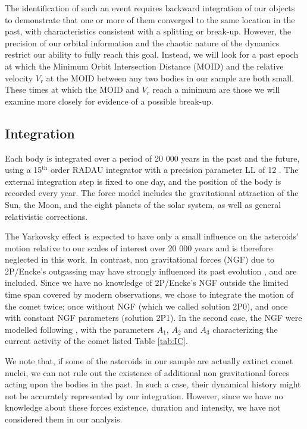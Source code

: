 \documentclass[letters,a4paper,fleqn,usenatbib]{mnras}
\begin{document}
The identification of such an event requires backward integration of our objects to demonstrate that one or more of them converged to the same location in the past, with characteristics consistent with a splitting or break-up. However, the precision of our orbital information and the chaotic nature of the dynamics restrict our ability to fully reach this goal. Instead, we will look for a past epoch at which the Minimum Orbit Intersection Distance (MOID) and the relative velocity $V_r$ at the MOID between any two bodies in our sample are both small. These times at which the MOID and $V_r$ reach a minimum are those we will examine more closely for evidence of a possible break-up.

\subsection{Integration}\label{sec:integration}

Each body is integrated over a period of 20 000 years in the past and the future, using a 15$^\text{th}$ order RADAU integrator with a precision parameter LL of 12 \citep{Everhart1985}. The external integration step is fixed to one day, and the position of the body is recorded every year. The force model includes the gravitational attraction of the Sun, the Moon, and the eight planets of the solar system, as well as general relativistic corrections. 

The Yarkovsky effect is expected to have only a small influence on the asteroids' motion relative to our scales of interest over 20 000 years \citep{Bottke2006a} and is therefore neglected in this work. In contrast, non gravitational forces (NGF) due to 2P/Encke's outgassing may have strongly influenced its past evolution \citep[e.g.,][]{Steel1996b,Levison2006}, and are included. Since we have no knowledge of 2P/Encke's NGF outside the limited time span covered by modern observations, we chose to integrate the motion of the comet twice; once without NGF (which we called solution 2P0), and once with constant NGF parameters (solution 2P1). In the second case, the NGF were modelled following \cite{Marsden1973}, with the parameters $A_1$, $A_2$ and $A_3$ characterizing the current activity of the comet listed Table \ref{tab:IC}. 

We note that, if some of the asteroids in our sample are actually extinct comet nuclei, we can not rule out the existence of additional non gravitational forces acting upon the bodies in the past. In such a case, their dynamical history might not be accurately represented by our integration. However, since we have no knowledge about these forces existence, duration and intensity, we have not considered them in our analysis. 
\end{document}
